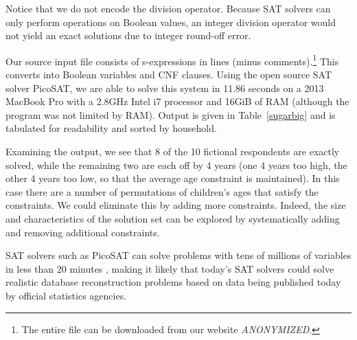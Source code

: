 \documentclass[runningheads]{llncs}
\begin{document}
Notice that we do not encode the division operator. Because SAT
solvers can only perform operations on Boolean values, an integer division
operator would not yield an exact solutions due to integer round-off error.

Our source input file consists of \NumSExpressions s-expressions in \NumConstraintLines{} lines (minus comments).\footnote{The entire file can be downloaded from our website \emph{ANONYMIZED}.}
This converts into
\NumVariables Boolean variables and \NumClauses CNF clauses. Using the
open source SAT solver PicoSAT\cite{Biere_picosatessentials}, we are able
to solve this system in 11.86 seconds on a 2013 MacBook Pro with a 2.8GHz Intel
i7 processor and 16GiB of RAM (although the program was not limited by RAM). Output is given in Table~\ref{sugarbig} and is tabulated for readability and sorted by household.

Examining the output, we see that 8 of the 10 fictional respondents are exactly solved, while the remaining two are each off by 4 years (one 4 years too high, the other 4 years too low, so that the average age constraint is maintained). In this case there are a number of permutations of children's ages that satisfy the constraints. We could eliminate this by adding more constraints. Indeed, the size and characteristics of the solution set can be explored by systematically adding and removing additional constraints. 

SAT solvers such as PicoSAT can solve problems
with tens of millions of variables in less than 20 minutes
\cite{satcomp}, making it likely that today's SAT solvers could solve
realistic database reconstruction problems based on data being
published today by official statistics agencies.
\end{document}
